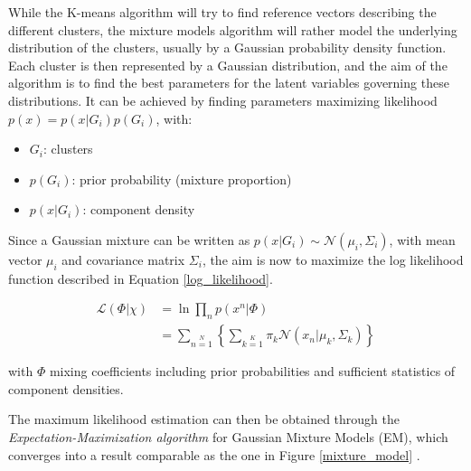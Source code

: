 \vspace{\baselineskip}
\noindent While the K-means algorithm will try to find reference vectors describing the different clusters, the mixture models algorithm will rather model the underlying distribution of the clusters, usually by a Gaussian probability density function. Each cluster is then represented by a Gaussian distribution, and the aim of the algorithm is to find the best parameters for the latent variables governing these distributions. It can be achieved by finding parameters maximizing likelihood $p(x)=p(x|G_i)p(G_i)$, with:

\begin{itemize}
\item $G_i$: clusters
\item $p(G_i)$: prior probability (mixture proportion)
\item $p(x|G_i)$: component density
\end{itemize}

\noindent Since a Gaussian mixture can be written as $p(x|G_i) \sim \mathcal{N}(\mu_i, \Sigma_i)$, with mean vector $\mu_i$ and covariance matrix $\Sigma_i$, the aim is now to maximize the log likelihood function described in Equation \ref{log_likelihood}.

\begin{equation}
\begin{array}{ll}
\mathcal{L}(\Phi|\chi) & = \ln \prod\limits_n p(x^n | \Phi) \\
 & = \sum\limits_{n=1}\limits^{N} \left\{ \sum \limits_{k=1}\limits^{K} \pi_k \mathcal{N}(x_n|\mu_k, \Sigma_k)\right\}
\end{array}
\label{log_likelihood}
\end{equation}

\noindent with $\Phi$ mixing coefficients including prior probabilities and sufficient statistics of component densities.
\newline

\noindent The maximum likelihood estimation can then be obtained through the \textit{Expectation-Maximization algorithm} for Gaussian Mixture Models (EM), which converges into a result comparable as the one in Figure \ref{mixture_model} \cite{BIS06}.
\newline


